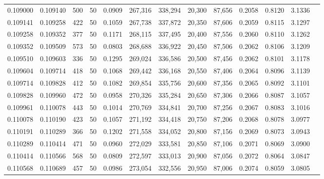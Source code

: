 \begin{tabular}{rrrrrrrrrrrrr}
0.109000 & 0.109140 &   500 &  50 &                                     0.0909 & 267,316 & 338,294 &  20,300 &  87,656 & 0.2058 & 0.8120 & 3.1336 \\
0.109141 & 0.109258 &   422 &  50 &                                     0.1059 & 267,738 & 337,872 &  20,350 &  87,606 & 0.2059 & 0.8115 & 3.1297 \\
0.109258 & 0.109352 &   377 &  50 &                                     0.1171 & 268,115 & 337,495 &  20,400 &  87,556 & 0.2060 & 0.8110 & 3.1262 \\
0.109352 & 0.109509 &   573 &  50 &                                     0.0803 & 268,688 & 336,922 &  20,450 &  87,506 & 0.2062 & 0.8106 & 3.1209 \\
0.109510 & 0.109603 &   336 &  50 &                                     0.1295 & 269,024 & 336,586 &  20,500 &  87,456 & 0.2062 & 0.8101 & 3.1178 \\
0.109604 & 0.109714 &   418 &  50 &                                     0.1068 & 269,442 & 336,168 &  20,550 &  87,406 & 0.2064 & 0.8096 & 3.1139 \\
0.109714 & 0.109828 &   412 &  50 &                                     0.1082 & 269,854 & 335,756 &  20,600 &  87,356 & 0.2065 & 0.8092 & 3.1101 \\
0.109828 & 0.109960 &   472 &  50 &                                     0.0958 & 270,326 & 335,284 &  20,650 &  87,306 & 0.2066 & 0.8087 & 3.1057 \\
0.109961 & 0.110078 &   443 &  50 &                                     0.1014 & 270,769 & 334,841 &  20,700 &  87,256 & 0.2067 & 0.8083 & 3.1016 \\
0.110078 & 0.110190 &   423 &  50 &                                     0.1057 & 271,192 & 334,418 &  20,750 &  87,206 & 0.2068 & 0.8078 & 3.0977 \\
0.110191 & 0.110289 &   366 &  50 &                                     0.1202 & 271,558 & 334,052 &  20,800 &  87,156 & 0.2069 & 0.8073 & 3.0943 \\
0.110289 & 0.110414 &   471 &  50 &                                     0.0960 & 272,029 & 333,581 &  20,850 &  87,106 & 0.2071 & 0.8069 & 3.0900 \\
0.110414 & 0.110566 &   568 &  50 &                                     0.0809 & 272,597 & 333,013 &  20,900 &  87,056 & 0.2072 & 0.8064 & 3.0847 \\
0.110568 & 0.110689 &   457 &  50 &                                     0.0986 & 273,054 & 332,556 &  20,950 &  87,006 & 0.2074 & 0.8059 & 3.0805 \\

\end{tabular}
